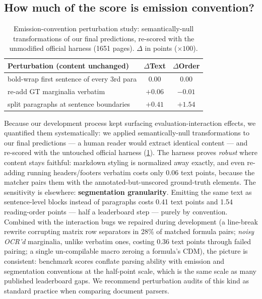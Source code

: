 \subsection{How much of the score is emission convention?}
\label{sec:perturb}

\begin{table}[t]
\centering
\caption{Emission-convention perturbation study: semantically-null transformations of our final predictions, re-scored with the unmodified official harness (1651 pages). $\Delta$ in points ($\times 100$).}
\label{tab:perturb}
\small
\setlength{\tabcolsep}{4pt}
\begin{tabular}{lcc}
\toprule
Perturbation (content unchanged) & $\Delta$Text & $\Delta$Order \\
\midrule
bold-wrap first sentence of every 3rd para & 0.00 & 0.00 \\
re-add GT marginalia verbatim & $+0.06$ & $-0.01$ \\
split paragraphs at sentence boundaries & $+0.41$ & $+1.54$ \\
\bottomrule
\end{tabular}
\end{table}

Because our development process kept surfacing evaluation-interaction effects, we quantified them systematically: we applied semantically-null transformations to our final predictions --- a human reader would extract identical content --- and re-scored with the untouched official harness (\cref{tab:perturb}). The harness proves \emph{robust} where content stays faithful: markdown styling is normalized away exactly, and even re-adding running headers/footers verbatim costs only 0.06 text points, because the matcher pairs them with the annotated-but-unscored ground-truth elements. The sensitivity is elsewhere: \textbf{segmentation granularity}. Emitting the same text as sentence-level blocks instead of paragraphs costs 0.41 text points and 1.54 reading-order points --- half a leaderboard step --- purely by convention. Combined with the interaction bugs we repaired during development (a line-break rewrite corrupting matrix row separators in 28\% of matched formula pairs; \emph{noisy OCR'd} marginalia, unlike verbatim ones, costing 0.36 text points through failed pairing; a single un-compilable macro zeroing a formula's CDM), the picture is consistent: benchmark scores conflate parsing ability with emission and segmentation conventions at the half-point scale, which is the same scale as many published leaderboard gaps. We recommend perturbation audits of this kind as standard practice when comparing document parsers.
